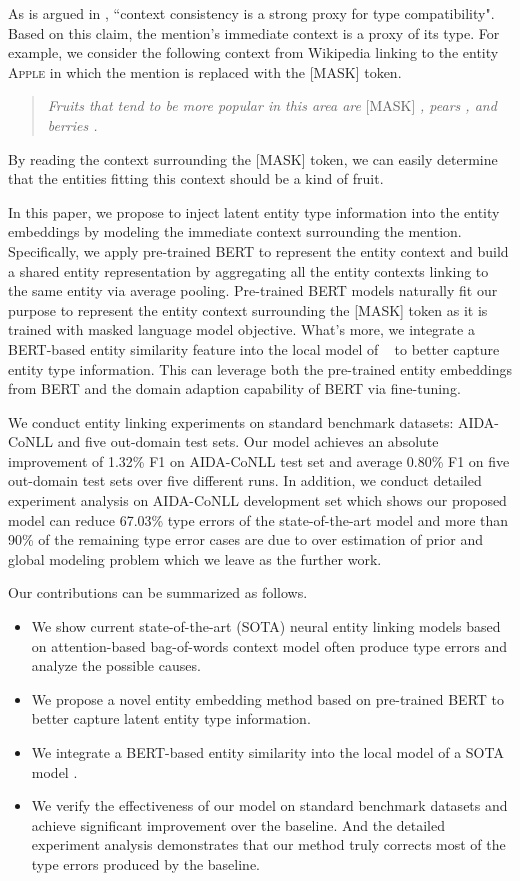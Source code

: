 \documentclass[letterpaper]{article} \usepackage{aaai20}  \usepackage{times}  \usepackage{helvet} \usepackage{courier}  \usepackage[hyphens]{url}  \usepackage{graphicx} \urlstyle{rm} \def\UrlFont{\rm}  \usepackage{graphicx}  \frenchspacing  \setlength{\pdfpagewidth}{8.5in}  \setlength{\pdfpageheight}{11in}  \usepackage{multirow}
\newcommand{\namecite}[1]{\citeauthor{#1}~\shortcite{#1}}
\begin{document}
As is argued in \cite{zhou-etal-2018-zero}, ``context consistency is a strong proxy for type compatibility". Based on this claim, the mention's immediate context is a proxy of its type. For example, we consider the following context from Wikipedia linking to the entity \textsc{Apple} in which the mention is replaced with the [MASK] token. 
\begin{quote}
{\em Fruits that tend to be more popular in this area are} [MASK] {\em , pears , and berries .}
\end{quote}
By reading the context surrounding the [MASK] token, we can easily determine that the entities fitting this context should be a kind of fruit. 

In this paper, we propose to inject latent entity type information into the entity embeddings by modeling the immediate context surrounding the mention. Specifically, we apply pre-trained BERT \cite{devlin-etal-2019-bert} to represent the entity context and build a shared entity representation by aggregating all the entity contexts linking to the same entity via average pooling. Pre-trained BERT models naturally fit our purpose to represent the entity context surrounding the [MASK] token as it is trained with masked language model objective. 
What's more, we integrate a BERT-based entity similarity feature into the local model of \namecite{ganea2017deep} to better capture entity type information. This can leverage both the pre-trained entity embeddings from BERT and the domain adaption capability of BERT via fine-tuning. 

We conduct entity linking experiments on standard benchmark datasets: AIDA-CoNLL and five out-domain test sets. Our model achieves an absolute improvement of 1.32\% F1 on AIDA-CoNLL test set and average 0.80\% F1 on five out-domain test sets over five different runs. In addition, we conduct detailed experiment analysis on AIDA-CoNLL development set which shows our proposed model can reduce 67.03\% type errors of the state-of-the-art model \cite{ganea2017deep} and more than 90\% of the remaining type error cases are due to over estimation of prior and global modeling problem which we leave as the further work.

Our contributions can be summarized as follows.
\begin{itemize}
    \item We show current state-of-the-art (SOTA) neural entity linking models based on attention-based bag-of-words context model often produce type errors and analyze the possible causes. 
    \item We propose a novel entity embedding method based on pre-trained BERT to better capture latent entity type information. 
    \item We integrate a BERT-based entity similarity into the local model of a SOTA model \cite{ganea2017deep}. \item We verify the effectiveness of our model on standard benchmark datasets and achieve significant improvement over the baseline. And the detailed experiment analysis demonstrates that our method truly corrects most of the type errors produced by the baseline.
\end{itemize}
\end{document}
